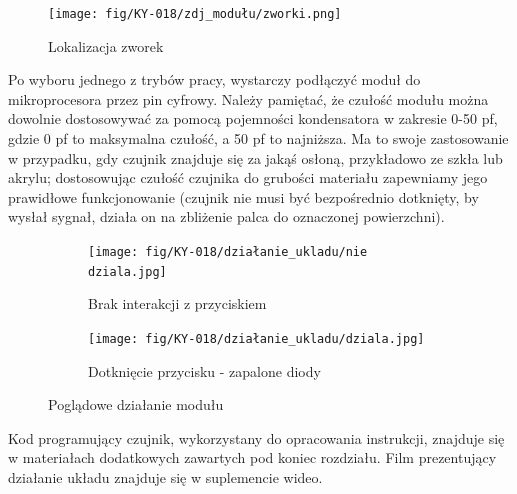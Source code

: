\documentclass[11pt, a4paper]{article}
\begin{document}
\begin{figure}[h!]
  \centering
  \texttt{[image: fig/KY-018/zdj\_modułu/zworki.png]}
  \caption{Lokalizacja zworek}
  \label{fig:sub1}
\end{figure}
\vspace{0.5cm}
\begin{table}[h!]
\centering
{}
\caption{\label{tab:table-name}Opis trybów pracy modułu}
\end{table}
Po wyboru jednego z trybów pracy, wystarczy podłączyć moduł do mikroprocesora przez pin cyfrowy. Należy pamiętać, że czułość modułu można dowolnie dostosowywać za pomocą pojemności kondensatora w zakresie 0-50 pf, gdzie 0 pf to maksymalna czułość, a 50 pf to najniższa. Ma to swoje zastosowanie w przypadku, gdy czujnik znajduje się za jakąś osłoną, przykładowo ze szkła lub akrylu; dostosowując czułość czujnika do grubości materiału zapewniamy jego prawidłowe funkcjonowanie (czujnik nie musi być bezpośrednio dotknięty, by wysłał sygnał, działa on na zbliżenie palca do oznaczonej powierzchni). 


\begin{figure}[h!]
\centering
\begin{subfigure}{.5\textwidth}
  \centering
  \texttt{[image: fig/KY-018/działanie\_ukladu/nie dziala.jpg]}
  \caption{Brak interakcji z przyciskiem}
  \label{fig:sub1}
\end{subfigure}%
\begin{subfigure}{.5\textwidth}
  \centering
  \texttt{[image: fig/KY-018/działanie\_ukladu/dziala.jpg]}
  \caption{Dotknięcie przycisku - zapalone diody}
  \label{fig:sub2}
\end{subfigure}
\caption{Poglądowe działanie modułu}
\label{fig:test}
\end{figure}



\newpage

Kod programujący czujnik, wykorzystany do opracowania instrukcji, znajduje się w materiałach dodatkowych zawartych pod koniec rozdziału.
\newline
Film prezentujący działanie układu znajduje się w suplemencie wideo.
\printbibliography[heading=bibintoc]
\end{document}
